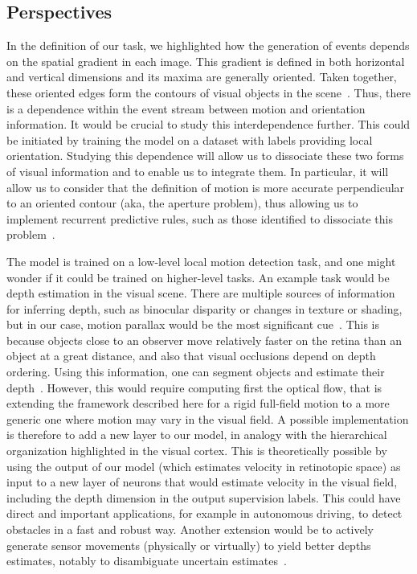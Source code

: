 \documentclass[default]{sn-jnl}%
\theoremstyle{thmstyleone}%
\theoremstyle{thmstyletwo}%
\theoremstyle{thmstylethree}%
\newcommand{\note}[1]{{\sethlcolor{yellow}\hl{#1}}}
\begin{document}
\subsection{Perspectives}
In the definition of our task, we highlighted how the generation of events depends on the spatial gradient in each image. This gradient is defined in both horizontal and vertical dimensions and its maxima are generally oriented. Taken together, these oriented edges form the contours of visual objects in the scene~\citep{koenderink_representation_1987}. Thus, there is a dependence within the event stream between motion and orientation information. It would be crucial to study this interdependence further. This could be initiated by training the model on a dataset with labels providing local orientation. %
Studying this dependence will allow us to dissociate these two forms of visual information and to enable us to integrate them. In particular, it will allow us to consider that the definition of motion is more accurate perpendicular to an oriented contour (aka, the aperture problem), thus allowing us to implement recurrent predictive rules, such as those identified to dissociate this problem~\citep{perrinet_motion-based_2012}.

The model is trained on a low-level local motion detection task, and one might wonder if it could be trained on higher-level tasks. An example task would be depth estimation in the visual scene. There are multiple sources of information for inferring depth, such as binocular disparity or changes in texture or shading, but in our case, motion parallax would be the most significant cue~\citep{rogers_motion_1979}. This is because objects close to an observer move relatively faster on the retina than an object at a great distance, and also that visual occlusions depend on depth ordering. Using this information, one can segment objects and estimate their depth~\citep{yoonessi_contribution_2011}. However, this would require computing first the optical flow, that is extending the framework described here for a rigid full-field motion to a more generic one where motion may vary in the visual field. A possible implementation is therefore to add a new layer to our model, in analogy with the hierarchical organization highlighted in the visual cortex. This is theoretically possible by using the output of our model (which estimates velocity in retinotopic space) as input to a new layer of neurons that would estimate velocity in the visual field, including the depth dimension in the output supervision labels. This could have direct and important applications, for example in autonomous driving, to detect obstacles in a fast and robust way. Another extension would be to actively generate sensor movements (physically or virtually) to yield better depths estimates, notably to disambiguate uncertain estimates~\citep{nawrot_eye_2003}.
\end{document}
